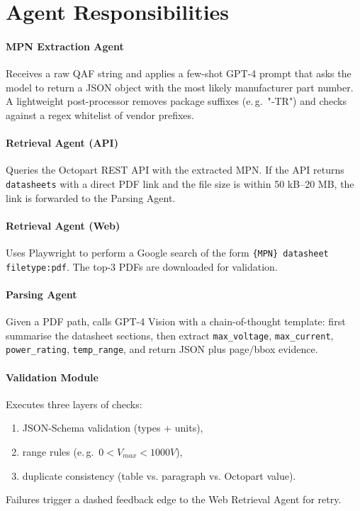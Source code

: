 \section{Agent Responsibilities}
\paragraph{MPN Extraction Agent}  
Receives a raw QAF string and applies a few-shot GPT-4 prompt that asks the model to return a JSON object with the most likely manufacturer part number.  
A lightweight post-processor removes package suffixes (e.\,g.\ "‐TR") and checks against a regex whitelist of vendor prefixes.

\paragraph{Retrieval Agent (API)}  
Queries the Octopart REST API with the extracted MPN.  
If the API returns \verb|datasheets| with a direct PDF link and the file size is within 50 kB–20 MB, the link is forwarded to the Parsing Agent.

\paragraph{Retrieval Agent (Web)}  
Uses Playwright to perform a Google search of the form  
\texttt{\{MPN\} datasheet filetype:pdf}.  
The top-3 PDFs are downloaded for validation.

\paragraph{Parsing Agent}  
Given a PDF path, calls GPT-4 Vision with a chain-of-thought template: first summarise the datasheet sections, then extract \verb|max_voltage|, \verb|max_current|, \verb|power_rating|, \verb|temp_range|, and return JSON plus page/bbox evidence.

\paragraph{Validation Module}  
Executes three layers of checks:
\begin{enumerate}
  \item JSON-Schema validation (types + units),
  \item range rules (e.\,g.\ $0 < V_{max} < 1000V$),
  \item duplicate consistency (table vs. paragraph vs. Octopart value).
\end{enumerate}  
Failures trigger a dashed feedback edge to the Web Retrieval Agent for retry.

